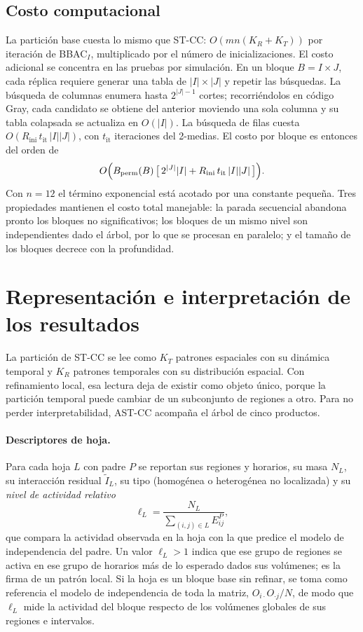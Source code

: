 \subsection{Costo computacional}

La partición base cuesta lo mismo que ST-CC: $O(mn(K_R+K_T))$ por iteración de
BBAC$_I$, multiplicado por el número de inicializaciones. El costo adicional se
concentra en las pruebas por simulación. En un bloque $B=I\times J$, cada
réplica requiere generar una tabla de $|I|\times|J|$ y repetir las búsquedas.
La búsqueda de columnas enumera hasta $2^{|J|-1}$ cortes; recorriéndolos en
código Gray, cada candidato se obtiene del anterior moviendo una sola columna y
su tabla colapsada se actualiza en $O(|I|)$. La búsqueda de filas cuesta
$O(R_{\mathrm{ini}}\, t_{\mathrm{it}}\,|I||J|)$, con $t_{\mathrm{it}}$
iteraciones del 2-medias. El costo por bloque es entonces del orden de
\[
  O\Bigl(B_{\mathrm{perm}}(B)\,\bigl[\,2^{|J|}|I| + R_{\mathrm{ini}}\,t_{\mathrm{it}}\,|I||J|\,\bigr]\Bigr).
\]
Con $n=12$ el término exponencial está acotado por una constante pequeña. Tres
propiedades mantienen el costo total manejable: la parada secuencial abandona
pronto los bloques no significativos; los bloques de un mismo nivel son
independientes dado el árbol, por lo que se procesan en paralelo; y el tamaño
de los bloques decrece con la profundidad.

\section{Representación e interpretación de los resultados}\label{sec:prop-representacion}

La partición de ST-CC se lee como $K_T$ patrones espaciales con su dinámica
temporal y $K_R$ patrones temporales con su distribución espacial. Con
refinamiento local, esa lectura deja de existir como objeto único, porque la
partición temporal puede cambiar de un subconjunto de regiones a otro. Para no
perder interpretabilidad, AST-CC acompaña el árbol de cinco productos.

\paragraph{Descriptores de hoja.} Para cada hoja $L$ con padre $P$ se reportan
sus regiones y horarios, su masa $N_L$, su interacción residual $\tilde I_L$, su
tipo (homogénea o heterogénea no localizada) y su \emph{nivel de actividad
relativo}
\begin{equation}\label{eq:prop-lift}
  \ell_L = \frac{N_L}{\sum_{(i,j)\in L} E^{P}_{ij}},
\end{equation}
que compara la actividad observada en la hoja con la que predice el modelo de
independencia del padre. Un valor $\ell_L>1$ indica que ese grupo de regiones se
activa en ese grupo de horarios más de lo esperado dados sus volúmenes; es la
firma de un patrón local. Si la hoja es un bloque base sin refinar, se
toma como referencia el modelo de independencia de toda la matriz,
$O_{i\cdot}O_{\cdot j}/N$, de modo que $\ell_L$ mide la actividad del bloque
respecto de los volúmenes globales de sus regiones e intervalos.

